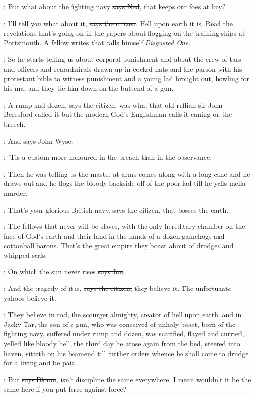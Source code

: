 \lambert:
But what about the fighting navy \sout{says Ned},
that keeps our foes at bay?

\citizen:
I'll tell you what about it, \sout{says the citizen}.
Hell upon earth it is.
Read the revelations that's going on in the papers about flogging on the
training ships at Portsmouth. A fellow writes that calls himself \emph{Disgusted
One}.

\Nq:
So he starts telling us about corporal punishment and about the crew
of tars and officers and rearadmirals drawn up in cocked hats and the
parson with his protestant bible to witness punishment and a young lad
brought out, howling for his ma, and they tie him down on the buttend of a
gun.

\citizen:
A rump and dozen, \sout{says the citizen,}
was what that old ruffian sir John
Beresford called it but the modern God's Englishman calls it caning on the
breech.%

\Nq:
And says John Wyse:

\johnwyse:
'Tis a custom more honoured in the breach
than in the observance.

\Nq:
Then he was telling us the master at arms comes along with a long
cane and he draws out and he flogs the bloody backside off of the poor lad
till he yells meila murder.

\citizen:
That's your glorious British navy,
\sout{says the citizen,}
that bosses the earth.

\citizen:
The fellows that never will be slaves,
with the only hereditary chamber on
the face of God's earth and their land in the hands of a dozen gamehogs
and cottonball barons. That's the great empire they boast about of drudges
and whipped serfs.%

\joe:
On which the sun never rises \sout{says Joe}.

\citizen:
And the tragedy of it is, \sout{says the citizen,}
they believe it. The
unfortunate yahoos believe it.

:
They believe in rod, the scourger almighty, creator of hell upon earth,
and in Jacky Tar, the son of a gun, who was conceived of unholy boast,
born of the fighting navy, suffered under rump and dozen, was scarified,
flayed and curried, yelled like bloody hell, the third day he arose again
from the bed, steered into haven, sitteth on his beamend till further
orders whence he shall come to drudge for a living and be paid.

\Bloom:
But \sout{says Bloom},
isn't discipline the same everywhere.
I mean wouldn't
it be the same here if you put force against force?

